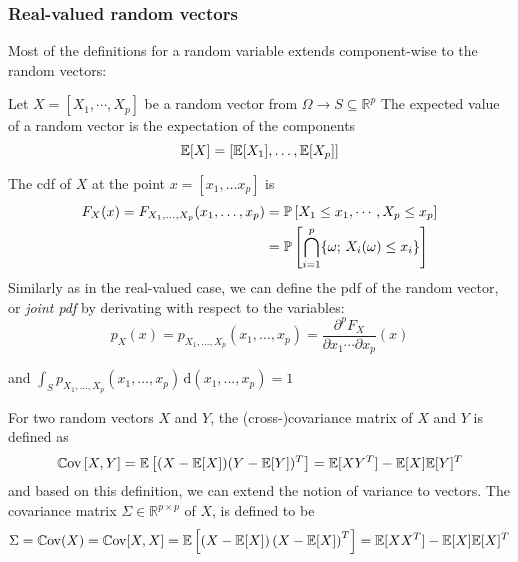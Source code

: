 \documentclass[../../Main_ManuscritThese.tex]{subfiles}
\begin{document}
\subsubsection{Real-valued random vectors}
 Most of the definitions for a random variable extends component-wise to the random vectors:

\begin{definition}
 \label{def:joint_marginal_cond_densities}
 Let $X=[X_1,\cdots,X_p]$ be a random vector from $\Omega \rightarrow S\subseteq\mathbb{R}^p$
 The expected value of a random vector is the expectation of the components
 \begin{equation}
\mathbb{E}[X] = \left[\mathbb{E}[X_1],\dots,\mathbb{E}[X_p]\right]
\end{equation}

The cdf of $X$ at the point $x=[x_1,\dots x_p]$ is
   \begin{align}
     \label{eq:def_cdf_multi}
     F_{X}(x) = F_{X_1,\dots, X_p}(x_1,\dots, x_p) &= \mathbb{P}\left[X_1 \leq x_1, \cdots, X_p\leq x_p\right]\\
                                                   &= \mathbb{P}\left[\bigcap_{i=1}^p \{\omega;\,X_i(\omega) \leq x_i\}\right] \nonumber
  \end{align}
 Similarly as in the real-valued case, we can define the pdf of the random vector, or \emph{joint pdf} by derivating with respect to the variables:
  \begin{equation}
    p_{X}(x)= p_{X_1,\dots, X_p}(x_1,\dots, x_p) =\frac{\partial^p F_X}{\partial x_1 \cdots \partial x_p}(x)
  \end{equation}
  
  and $\int_{S}p_{X_1,\dots, X_p}(x_1,\dots, x_p)\,\mathrm{d}(x_1,\dots, x_p)=1$

For two random vectors $X$ and $Y$, the (cross-)covariance matrix of $X$ and $Y$ is defined as  
  \begin{equation}
    \mathbb{C}\mathrm{ov}\left[X,Y\right] = \mathbb{E}\left[(X-\mathbb{E}[X])(Y - \mathbb{E}[Y])^T\right] = \mathbb{E}[XY^T] - \mathbb{E}[X]\mathbb{E}[Y]^T
  \end{equation}
and based on this definition, we can extend the notion of variance to vectors. The covariance matrix $\Sigma \in \mathbb{R}^{p\times p}$ of $X$, is defined to be
  \begin{equation}
    \Sigma = \mathbb{C}\mathrm{ov}(X)=\mathbb{C}\mathrm{ov}[X,X]= \mathbb{E}\left[\left(X - \mathbb{E}[X]\right)\left(X-\mathbb{E}[X]\right)^T\right] = \mathbb{E}[XX^T] - \mathbb{E}[X]\mathbb{E}[X]^T
  \end{equation}



\end{definition}
\end{document}
